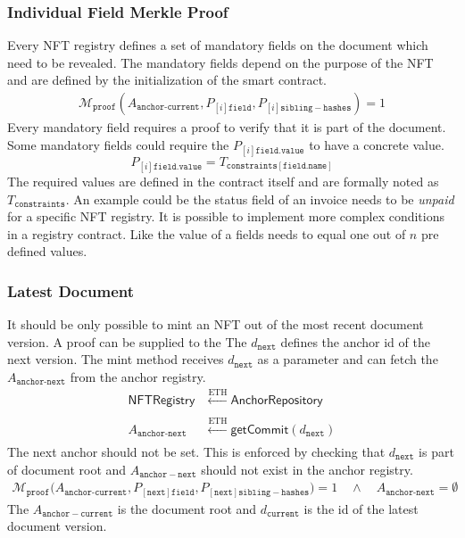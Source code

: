 \subsubsection{Individual Field Merkle Proof}
Every NFT registry defines a set of mandatory fields on the document which need to be revealed. The mandatory fields depend on the purpose of the NFT and are defined by the initialization of the smart contract.
\begin{equation}
\begin{split}
\mathcal{M}_{\texttt{proof}}(A_{\texttt{anchor-current}} ,P_{[i]\mathtt{field}},P_{[i]\mathtt{sibling-hashes}}) = 1
\end{split}
\end{equation}
Every mandatory field requires a proof to verify that it is part of the document. Some mandatory fields could require the $P_{[i]\mathtt{field.value}}$ to have a concrete value.
\begin{equation}
    P_{[i]\mathtt{field.value}} = T_{\mathtt{constraints}[\mathtt{field.name}]}
\end{equation}
The required values are defined in the contract itself and are formally noted as $T_{\mathtt{constraints}}$. An example could be the status field of an invoice needs to be \textit{unpaid} for a specific NFT registry. It is possible to implement more complex conditions in a registry contract. Like the value of a fields needs to equal one out of $n$ pre defined values. 
\subsubsection{Latest Document}
It should be only possible to mint an NFT out of the most recent document version. A proof can be supplied to the The $d_{\mathtt{next}}$ defines the anchor id of the next version. The mint method receives $d_{\mathtt{next}}$ as a parameter and can fetch the $A_{\texttt{anchor-next}}$ from the anchor registry.
\begin{equation}
\begin{split}
\mathsf{NFTRegistry} &\xleftarrow[]{\text{ETH}}  \mathsf{AnchorRepository} \\
A_{\texttt{anchor-next}} &\xleftarrow[]{\text{ETH}} \textsf{getCommit}(d_{\mathtt{next}})
\end{split}
\end{equation}
The next anchor should not be set. This is enforced by checking that $d_{\mathtt{next}}$ is part of document root and $A_{\mathtt{anchor-next}}$ should not exist in the anchor registry.
\begin{equation}
\begin{split}
\mathcal{M}_{\texttt{proof}}(A_{\texttt{anchor-current}} ,P_{[\mathtt{next}]\mathtt{field}}, &P_{[\mathtt{next}]\mathtt{sibling-hashes}})  = 1 \quad \land \quad
A_{\texttt{anchor-next}} = \emptyset 
\end{split}
\end{equation}
The $A_{\mathtt{anchor-current}}$ is the document root and $d_\mathtt{current}$ is the id of the latest document version.
